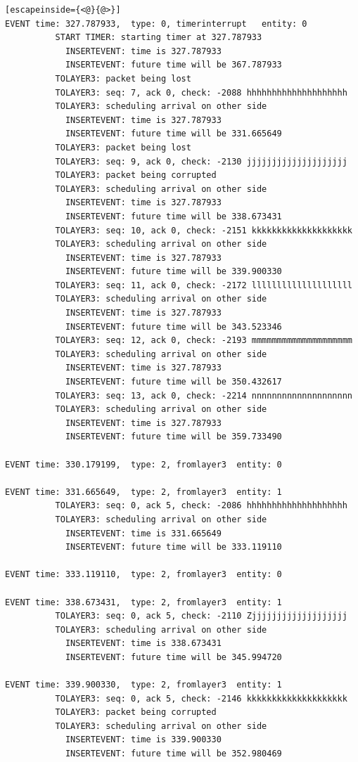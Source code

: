 \documentclass[paper=a4, fontsize=11pt]{scrartcl}
\numberwithin{equation}{section}		%
\numberwithin{figure}{section}			%
\numberwithin{table}{section}				%
\begin{document}
\begin{lstlisting}[escapeinside={<@}{@>}]
EVENT time: 327.787933,  type: 0, timerinterrupt   entity: 0
          START TIMER: starting timer at 327.787933
            INSERTEVENT: time is 327.787933
            INSERTEVENT: future time will be 367.787933
          TOLAYER3: packet being lost
          TOLAYER3: seq: 7, ack 0, check: -2088 hhhhhhhhhhhhhhhhhhhh
          TOLAYER3: scheduling arrival on other side
            INSERTEVENT: time is 327.787933
            INSERTEVENT: future time will be 331.665649
          TOLAYER3: packet being lost
          TOLAYER3: seq: 9, ack 0, check: -2130 jjjjjjjjjjjjjjjjjjjj
          TOLAYER3: packet being corrupted
          TOLAYER3: scheduling arrival on other side
            INSERTEVENT: time is 327.787933
            INSERTEVENT: future time will be 338.673431
          TOLAYER3: seq: 10, ack 0, check: -2151 kkkkkkkkkkkkkkkkkkkk
          TOLAYER3: scheduling arrival on other side
            INSERTEVENT: time is 327.787933
            INSERTEVENT: future time will be 339.900330
          TOLAYER3: seq: 11, ack 0, check: -2172 llllllllllllllllllll
          TOLAYER3: scheduling arrival on other side
            INSERTEVENT: time is 327.787933
            INSERTEVENT: future time will be 343.523346
          TOLAYER3: seq: 12, ack 0, check: -2193 mmmmmmmmmmmmmmmmmmmm
          TOLAYER3: scheduling arrival on other side
            INSERTEVENT: time is 327.787933
            INSERTEVENT: future time will be 350.432617
          TOLAYER3: seq: 13, ack 0, check: -2214 nnnnnnnnnnnnnnnnnnnn
          TOLAYER3: scheduling arrival on other side
            INSERTEVENT: time is 327.787933
            INSERTEVENT: future time will be 359.733490

EVENT time: 330.179199,  type: 2, fromlayer3  entity: 0

EVENT time: 331.665649,  type: 2, fromlayer3  entity: 1
          TOLAYER3: seq: 0, ack 5, check: -2086 hhhhhhhhhhhhhhhhhhhh
          TOLAYER3: scheduling arrival on other side
            INSERTEVENT: time is 331.665649
            INSERTEVENT: future time will be 333.119110

EVENT time: 333.119110,  type: 2, fromlayer3  entity: 0

EVENT time: 338.673431,  type: 2, fromlayer3  entity: 1
          TOLAYER3: seq: 0, ack 5, check: -2110 Zjjjjjjjjjjjjjjjjjjj
          TOLAYER3: scheduling arrival on other side
            INSERTEVENT: time is 338.673431
            INSERTEVENT: future time will be 345.994720

EVENT time: 339.900330,  type: 2, fromlayer3  entity: 1
          TOLAYER3: seq: 0, ack 5, check: -2146 kkkkkkkkkkkkkkkkkkkk
          TOLAYER3: packet being corrupted
          TOLAYER3: scheduling arrival on other side
            INSERTEVENT: time is 339.900330
            INSERTEVENT: future time will be 352.980469


\end{lstlisting}
\end{document}
